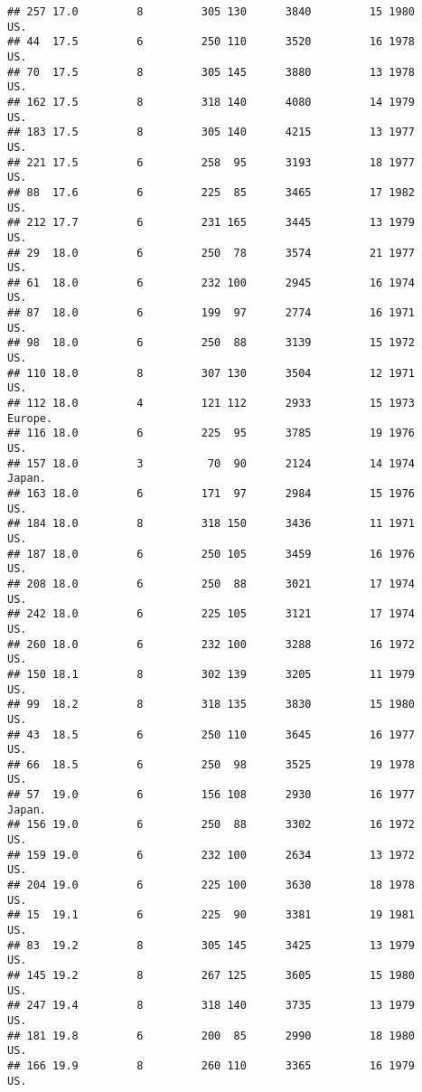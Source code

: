 \documentclass[11pt,]{article}
\begin{document}
\begin{verbatim}
## 257 17.0         8         305 130      3840         15 1980      US.
## 44  17.5         6         250 110      3520         16 1978      US.
## 70  17.5         8         305 145      3880         13 1978      US.
## 162 17.5         8         318 140      4080         14 1979      US.
## 183 17.5         8         305 140      4215         13 1977      US.
## 221 17.5         6         258  95      3193         18 1977      US.
## 88  17.6         6         225  85      3465         17 1982      US.
## 212 17.7         6         231 165      3445         13 1979      US.
## 29  18.0         6         250  78      3574         21 1977      US.
## 61  18.0         6         232 100      2945         16 1974      US.
## 87  18.0         6         199  97      2774         16 1971      US.
## 98  18.0         6         250  88      3139         15 1972      US.
## 110 18.0         8         307 130      3504         12 1971      US.
## 112 18.0         4         121 112      2933         15 1973  Europe.
## 116 18.0         6         225  95      3785         19 1976      US.
## 157 18.0         3          70  90      2124         14 1974   Japan.
## 163 18.0         6         171  97      2984         15 1976      US.
## 184 18.0         8         318 150      3436         11 1971      US.
## 187 18.0         6         250 105      3459         16 1976      US.
## 208 18.0         6         250  88      3021         17 1974      US.
## 242 18.0         6         225 105      3121         17 1974      US.
## 260 18.0         6         232 100      3288         16 1972      US.
## 150 18.1         8         302 139      3205         11 1979      US.
## 99  18.2         8         318 135      3830         15 1980      US.
## 43  18.5         6         250 110      3645         16 1977      US.
## 66  18.5         6         250  98      3525         19 1978      US.
## 57  19.0         6         156 108      2930         16 1977   Japan.
## 156 19.0         6         250  88      3302         16 1972      US.
## 159 19.0         6         232 100      2634         13 1972      US.
## 204 19.0         6         225 100      3630         18 1978      US.
## 15  19.1         6         225  90      3381         19 1981      US.
## 83  19.2         8         305 145      3425         13 1979      US.
## 145 19.2         8         267 125      3605         15 1980      US.
## 247 19.4         8         318 140      3735         13 1979      US.
## 181 19.8         6         200  85      2990         18 1980      US.
## 166 19.9         8         260 110      3365         16 1979      US.

\end{verbatim}
\end{document}
